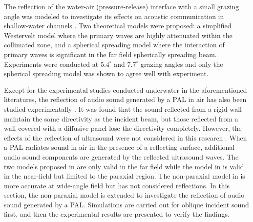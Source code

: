 The reflection of the water-air (pressure-release) interface with a small grazing angle was modeled to investigate its effects on acoustic communication in shallow-water channels \cite{Wang1999SecondaryFieldParametric}.
Two theoretical models were proposed: a simplified Westervelt model where the primary waves are highly attenuated within the collimated zone, and a spherical spreading model where the interaction of primary waves is significant in the far field spherically spreading beam. 
Experiments were conducted at $5.4^\circ$ and $7.7^\circ$ grazing angles and only the spherical spreading model was shown to agree well with experiment. 

Except for the experimental studies conducted underwater in the aforementioned literatures, the reflection of audio sound generated by a PAL in air has also been studied experimentally \cite{Pompei2002SoundUltrasoundParametric}.
It was found that the sound reflected from a rigid wall maintain the same directivity as the incident beam, but those reflected from a wall covered with a diffusive panel lose the directivity completely. 
However, the effects of the reflection of ultrasound were not considered in this research \cite{Pompei2002SoundUltrasoundParametric}. 
When a PAL radiates sound in air in the presence of a reflecting surface, additional audio sound components are generated by the reflected ultrasound waves. 
The two models proposed in \cite{Wang1999SecondaryFieldParametric} are only valid in the far field while the model in \cite{Garrett1984ReflectionParametricRadiation} is valid in the near-field but limited to the paraxial region. 
The non-paraxial model in \cite{Cervenka2013NonparaxialModelParametric, Zhong2020SphericalExpansionAudio} is more accurate at wide-angle field but has not considered reflections. 
In this section, the non-paraxial model is extended to investigate the reflection of audio sound generated by a PAL. 
Simulations are carried out for oblique incident sound first, and then the experimental results are presented to verify the findings.


